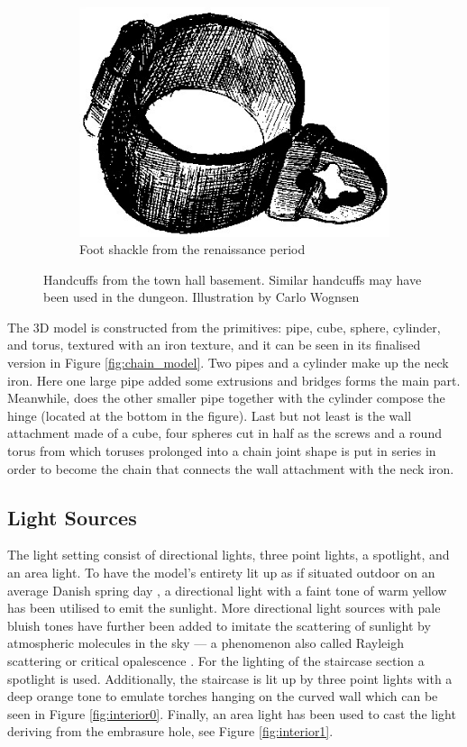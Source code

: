 \begin{figure}
\begin{subfigure}[h!]{0.3\textwidth}
        \includegraphics[width=\textwidth]{figures/chains2.jpg}
        \caption{Foot shackle from the renaissance period}\label{fig:chains2}
    \end{subfigure}
    \caption{Handcuffs from the town hall basement. Similar handcuffs may have been used in the dungeon. Illustration by Carlo Wognsen \cite{Riismoller1961}}\label{fig:chains}
\end{figure}

\pagebreak
The 3D model is constructed from the primitives: pipe, cube, sphere, cylinder, and torus, textured with an iron texture, and it can be seen in its finalised version in  Figure \ref{fig:chain_model}. 
Two pipes and a cylinder make up the neck iron. Here one large pipe added some extrusions and bridges forms the main part. Meanwhile, does the other smaller pipe together with the cylinder compose the hinge (located at the bottom in the figure). Last but not least is the wall attachment made of a cube, four spheres cut in half as the screws and a round torus from which toruses prolonged into a chain joint shape is put in series in order to become the chain that connects the wall attachment with the neck iron.

\subsection{Light Sources}
The light setting consist of directional lights, three point lights, a spotlight, and an area light. To have the model’s entirety lit up as if situated outdoor on an average Danish spring day \cite{DMI}, a directional light with a faint tone of warm yellow has been utilised to emit the sunlight. More directional light sources with pale bluish tones have further been added to imitate the scattering of sunlight by atmospheric molecules in the sky --- a phenomenon also called Rayleigh scattering or critical opalescence \cite{DOE} \cite{Renn2005}. For the lighting of the staircase section a spotlight is used. Additionally, the staircase is lit up by three point lights with a deep orange tone to emulate torches hanging on the curved wall which can be seen in Figure \ref{fig:interior0}. Finally, an area light has been used to cast the light deriving from the embrasure hole, see Figure \ref{fig:interior1}.\pagebreak

